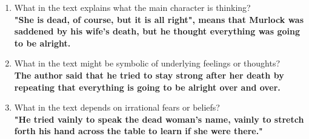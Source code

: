 \begin{enumerate}
\begin{enumerate}
      \item What in the text explains what the main character is thinking? \\
          \textbf{"She is dead, of course, but it is all right", means that
            Murlock was saddened by his wife's death, but he thought everything
            was going to be alright.}
      \item What in the text might be symbolic of underlying feelings or
        thoughts? \\
          \textbf{The author said that he tried to stay strong after her death
          by repeating that everything is going to be alright over and over.}
      \item What in the text depends on irrational fears or beliefs? \\
          \textbf{"He tried vainly to speak the dead woman's name, vainly to
            stretch forth his hand across the table to learn if she were there."}
    \end{enumerate}
\end{enumerate}
